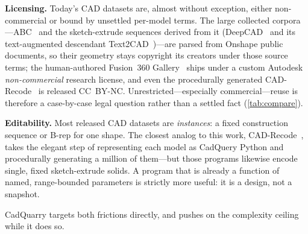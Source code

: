 \documentclass[11pt]{article}
\begin{document}
\textbf{Licensing.} Today's CAD datasets are, almost without exception, either
non-commercial or bound by unsettled per-model terms. The large collected
corpora---ABC~\cite{abc} and the sketch-extrude sequences derived from it
(DeepCAD~\cite{deepcad} and its text-augmented descendant
Text2CAD~\cite{text2cad})---are parsed from Onshape public documents, so their
geometry stays copyright its creators under those source terms; the
human-authored Fusion~360 Gallery~\cite{fusion360} ships under a custom Autodesk
\emph{non-commercial} research license, and even the procedurally generated
CAD-Recode~\cite{cadrecode} is released CC~BY-NC. Unrestricted---especially
commercial---reuse is therefore a
case-by-case legal question rather than a settled fact (\cref{tab:compare}).

\textbf{Editability.} Most released CAD datasets are \emph{instances}: a fixed
construction sequence or B-rep for one shape. The closest analog to this work,
CAD-Recode~\cite{cadrecode}, takes the elegant step of representing each model as
CadQuery Python and procedurally generating a million of them---but those
programs likewise encode single, fixed sketch-extrude solids. A program that is
already a function of named, range-bounded parameters is strictly more useful: it
is a design, not a snapshot.

CadQuarry targets both frictions directly, and pushes on the complexity ceiling
while it does so.
\end{document}
